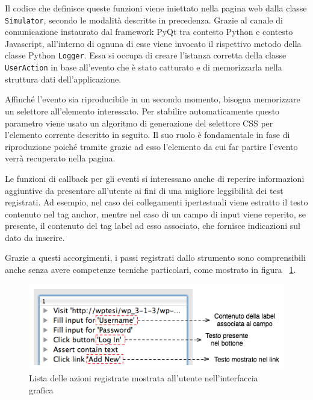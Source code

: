 Il codice che definisce queste funzioni viene iniettato nella pagina web dalla classe \verb|Simulator|, secondo le modalità descritte in precedenza. Grazie al canale di comunicazione instaurato dal framework PyQt tra contesto Python e contesto Javascript, all'interno di ognuna di esse viene invocato il rispettivo metodo della classe Python \verb|Logger|. Essa si occupa di creare l'istanza corretta della classe \verb|UserAction| in base all'evento che è stato catturato e di memorizzarla nella struttura dati dell'applicazione.



Affinché l'evento sia riproducibile in un secondo momento, bisogna memorizzare un selettore all'elemento interessato. Per stabilire automaticamente questo parametro viene usato un algoritmo di generazione del selettore CSS per l'elemento corrente descritto in seguito. Il suo ruolo è fondamentale in fase di riproduzione poiché tramite grazie ad esso l'elemento da cui far partire l'evento verrà recuperato nella pagina. 

Le funzioni di callback per gli eventi si interessano anche di reperire informazioni aggiuntive da presentare all'utente ai fini di una migliore leggibilità dei test registrati. Ad esempio, nel caso dei collegamenti ipertestuali viene estratto il testo contenuto nel tag anchor, mentre nel caso di un campo di input viene reperito, se presente, il contenuto del tag label ad esso associato, che fornisce indicazioni sul dato da inserire. 

Grazie a questi accorgimenti, i passi registrati dallo strumento sono comprensibili anche senza avere competenze tecniche particolari, come mostrato in figura ~\ref{fig:actionNotes}.

\begin{figure}[htbp]
\begin{center}
\includegraphics[width=\textwidth]{images/action_notes.png}
\caption{Lista delle azioni registrate mostrata all'utente nell'interfaccia grafica}
\label{fig:actionNotes}
\end{center}
\end{figure}


